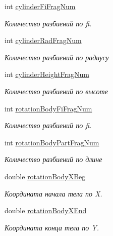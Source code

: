 \begin{DoxyCompactItemize}
int \mbox{\hyperlink{group__cylinder_parameters_gaf2ce6a505c18dabc6ac9854b29fd0c0e}{cylinder\+Fi\+Frag\+Num}}
\begin{DoxyCompactList}\small\item\em Количество разбиений по fi. \end{DoxyCompactList}\item 
int \mbox{\hyperlink{group__cylinder_parameters_ga004a13f947c1f437f57f29fc6bbe5f7d}{cylinder\+Rad\+Frag\+Num}}
\begin{DoxyCompactList}\small\item\em Количество разбиений по радиусу \end{DoxyCompactList}\item 
int \mbox{\hyperlink{group__cylinder_parameters_gafa21e09152b4d7c81b6526392c8e18ca}{cylinder\+Height\+Frag\+Num}}
\begin{DoxyCompactList}\small\item\em Количество разбиений по высоте \end{DoxyCompactList}\item 
int \mbox{\hyperlink{group__rotation_body_parameters_gad70b7c7cc282797993ba0f76ef453fbc}{rotation\+Body\+Fi\+Frag\+Num}}
\begin{DoxyCompactList}\small\item\em Количество разбиений по fi. \end{DoxyCompactList}\item 
int \mbox{\hyperlink{group__rotation_body_parameters_gafabec4b411be9ee7e89b42b765e765aa}{rotation\+Body\+Part\+Frag\+Num}}
\begin{DoxyCompactList}\small\item\em Количество разбиений по длине \end{DoxyCompactList}\item 
double \mbox{\hyperlink{group__rotation_body_parameters_ga1d8076cbbcfaccb02ce40b9799308bb6}{rotation\+Body\+X\+Beg}}
\begin{DoxyCompactList}\small\item\em Координата начала тела по X. \end{DoxyCompactList}\item 
double \mbox{\hyperlink{group__rotation_body_parameters_ga8507989eaebe1d60032a373a3412e75a}{rotation\+Body\+X\+End}}
\begin{DoxyCompactList}\small\item\em Координата конца тела по Y. \end{DoxyCompactList}\item 

\end{DoxyCompactItemize}

